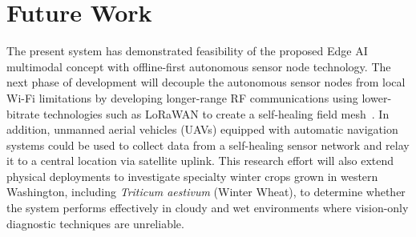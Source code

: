 \documentclass[10pt,twocolumn]{article}
\begin{document}
\section{Future Work}
\label{sec:future}
The present system has demonstrated feasibility of the proposed Edge AI multimodal concept with offline-first autonomous sensor node technology.
The next phase of development will decouple the autonomous sensor nodes from local Wi-Fi limitations by developing longer-range RF communications using lower-bitrate technologies such as LoRaWAN to create a self-healing field mesh~\cite{ref15}.
In addition, unmanned aerial vehicles (UAVs) equipped with automatic navigation systems could be used to collect data from a self-healing sensor network and relay it to a central location via satellite uplink.
This research effort will also extend physical deployments to investigate specialty winter crops grown in western Washington, including \textit{Triticum aestivum} (Winter Wheat), to determine whether the system performs effectively in cloudy and wet environments where vision-only diagnostic techniques are unreliable.
\end{document}
